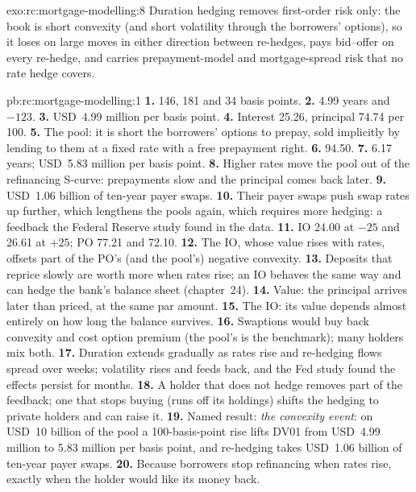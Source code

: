 \begin{solution}{exo:rc:mortgage-modelling:8}
Duration hedging removes first-order risk only: the book is short convexity (and short
volatility through the borrowers' options), so it loses on large moves in either direction
between re-hedges, pays bid--offer on every re-hedge, and carries prepayment-model and
mortgage-spread risk that no rate hedge covers.
\end{solution}

\begin{solution}{pb:rc:mortgage-modelling:1}
\textbf{1.} 146, 181 and 34 basis points.
\textbf{2.} 4.99 years and $-123$.
\textbf{3.} USD~4.99 million per basis point.
\textbf{4.} Interest 25.26, principal 74.74 per 100.
\textbf{5.} The pool: it is short the borrowers' options to prepay, sold implicitly by
lending to them at a fixed rate with a free prepayment right.
\textbf{6.} 94.50.
\textbf{7.} 6.17 years; USD~5.83 million per basis point.
\textbf{8.} Higher rates move the pool out of the refinancing S-curve: prepayments slow and
the principal comes back later.
\textbf{9.} USD~1.06 billion of ten-year payer swaps.
\textbf{10.} Their payer swaps push swap rates up further, which lengthens the pools again,
which requires more hedging: a feedback the Federal Reserve study found in the data.
\textbf{11.} IO 24.00 at $-25$ and 26.61 at $+25$; PO 77.21 and 72.10.
\textbf{12.} The IO, whose value rises with rates, offsets part of the PO's (and the pool's)
negative convexity.
\textbf{13.} Deposits that reprice slowly are worth more when rates rise; an IO behaves the
same way and can hedge the bank's balance sheet (chapter~24).
\textbf{14.} Value: the principal arrives later than priced, at the same par amount.
\textbf{15.} The IO: its value depends almost entirely on how long the balance survives.
\textbf{16.} Swaptions would buy back convexity and cost option premium (the pool's  is the benchmark); many holders mix both.
\textbf{17.} Duration extends gradually as rates rise and re-hedging flows spread over weeks;
volatility rises and feeds back, and the Fed study found the effects persist for months.
\textbf{18.} A holder that does not hedge removes part of the feedback; one that stops
buying (runs off its holdings) shifts the hedging to private holders and can raise it.
\textbf{19.} Named result: \emph{the convexity event}: on USD~10 billion of the pool a 100-basis-point
rise lifts DV01 from USD~4.99 million to 5.83 million per basis point, and re-hedging takes
USD~1.06 billion of ten-year payer swaps.
\textbf{20.} Because borrowers stop refinancing when rates rise, exactly when the holder
would like its money back.
\end{solution}

